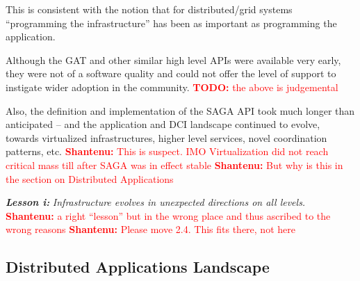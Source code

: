 \documentclass{article}
\newcommand{\I}[1]{\textit{#1}}
\newcommand{\B}[1]{\textbf{#1}}
\newcommand{\BI}[1]{\textbf{\textit{#1}}}
\newcommand{\todo}[1]{{\textcolor{red}{\B{TODO:} #1 }}}
\newcommand{\jhanote}[1]{{\textcolor{red}{     \B{Shantenu:} #1 }}}
\newcommand{\todo}[1]{}
\newcommand{\jhanote}[1]{}
\begin{document}
  This is consistent with the notion that for distributed/grid systems
  ``programming the infrastructure'' has been as important as programming the
  application.

  
  

  Although the GAT and other similar high level APIs were available very early,
  they were not of a software quality and could not offer the level of support
  to instigate wider adoption in the community. 
  \todo{the above is judgemental}

  Also, the definition and implementation of the SAGA API took much longer than
  anticipated -- and the application and DCI landscape continued to evolve,
  towards virtualized infrastructures, higher level services, novel coordination
  patterns, etc.  \jhanote{This is suspect. IMO Virtualization did not reach
  critical mass till after SAGA was in effect stable} \jhanote{But why is this
  in the section on Distributed Applications}

  \BI{Lesson i:} \I{Infrastructure evolves in unexpected directions  on all
  levels.}  \jhanote{a right ``lesson'' but in the wrong place and thus ascribed
  to the wrong reasons} \jhanote{Please move 2.4. This fits there, not here}

 \subsection{Distributed Applications Landscape}
\end{document}
